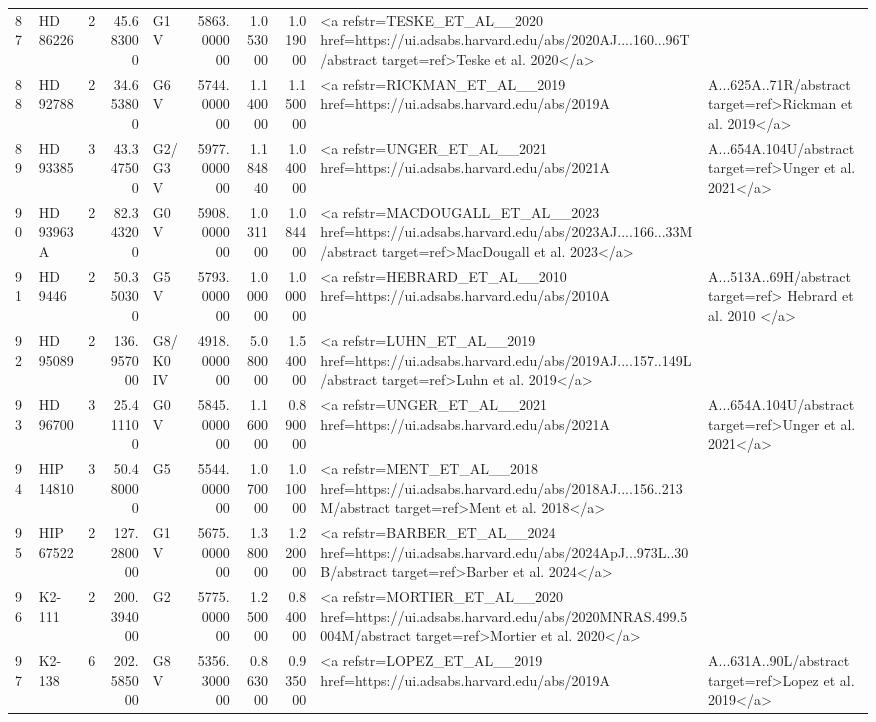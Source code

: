 \begin{tabular}{llrrlrrrl}
87 & HD 86226 & 2 & 45.683000 & G1 V & 5863.000000 & 1.053000 & 1.019000 & <a refstr=TESKE_ET_AL__2020 href=https://ui.adsabs.harvard.edu/abs/2020AJ....160...96T/abstract target=ref>Teske et al. 2020</a> \\
88 & HD 92788 & 2 & 34.653800 & G6 V & 5744.000000 & 1.140000 & 1.150000 & <a refstr=RICKMAN_ET_AL__2019 href=https://ui.adsabs.harvard.edu/abs/2019A&A...625A..71R/abstract target=ref>Rickman et al. 2019</a> \\
89 & HD 93385 & 3 & 43.347500 & G2/G3 V & 5977.000000 & 1.184840 & 1.040000 & <a refstr=UNGER_ET_AL__2021 href=https://ui.adsabs.harvard.edu/abs/2021A&A...654A.104U/abstract target=ref>Unger et al. 2021</a> \\
90 & HD 93963 A & 2 & 82.343200 & G0 V & 5908.000000 & 1.031100 & 1.084400 & <a refstr=MACDOUGALL_ET_AL__2023 href=https://ui.adsabs.harvard.edu/abs/2023AJ....166...33M/abstract target=ref>MacDougall et al. 2023</a> \\
91 & HD 9446 & 2 & 50.350300 & G5 V & 5793.000000 & 1.000000 & 1.000000 & <a refstr=HEBRARD_ET_AL__2010 href=https://ui.adsabs.harvard.edu/abs/2010A&A...513A..69H/abstract target=ref> Hebrard et al. 2010 </a> \\
92 & HD 95089 & 2 & 136.957000 & G8/K0 IV & 4918.000000 & 5.080000 & 1.540000 & <a refstr=LUHN_ET_AL__2019 href=https://ui.adsabs.harvard.edu/abs/2019AJ....157..149L/abstract target=ref>Luhn et al. 2019</a> \\
93 & HD 96700 & 3 & 25.411100 & G0 V & 5845.000000 & 1.160000 & 0.890000 & <a refstr=UNGER_ET_AL__2021 href=https://ui.adsabs.harvard.edu/abs/2021A&A...654A.104U/abstract target=ref>Unger et al. 2021</a> \\
94 & HIP 14810 & 3 & 50.480000 & G5 & 5544.000000 & 1.070000 & 1.010000 & <a refstr=MENT_ET_AL__2018 href=https://ui.adsabs.harvard.edu/abs/2018AJ....156..213M/abstract target=ref>Ment et al. 2018</a> \\
95 & HIP 67522 & 2 & 127.280000 & G1 V & 5675.000000 & 1.380000 & 1.220000 & <a refstr=BARBER_ET_AL__2024 href=https://ui.adsabs.harvard.edu/abs/2024ApJ...973L..30B/abstract target=ref>Barber et al. 2024</a> \\
96 & K2-111 & 2 & 200.394000 & G2 & 5775.000000 & 1.250000 & 0.840000 & <a refstr=MORTIER_ET_AL__2020 href=https://ui.adsabs.harvard.edu/abs/2020MNRAS.499.5004M/abstract target=ref>Mortier et al. 2020</a> \\
97 & K2-138 & 6 & 202.585000 & G8 V & 5356.300000 & 0.863000 & 0.935000 & <a refstr=LOPEZ_ET_AL__2019 href=https://ui.adsabs.harvard.edu/abs/2019A&A...631A..90L/abstract target=ref>Lopez et al. 2019</a> \\

\end{tabular}
